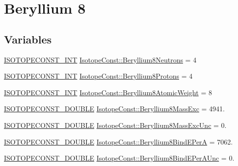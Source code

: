 \hypertarget{group___isotope_const-_beryllium-_be8}{}\section{Beryllium 8}
\label{group___isotope_const-_beryllium-_be8}
\subsection*{Variables}
\begin{DoxyCompactItemize}
\item 
\mbox{\hyperlink{group___isotope_const-_macros_ga5f18360b3e99483a35c32d789e62621c}{I\+S\+O\+T\+O\+P\+E\+C\+O\+N\+S\+T\+\_\+\+I\+NT}} \mbox{\hyperlink{group___isotope_const-_beryllium-_be8_ga0ece899d72ebfa6de79d0d7805ead65d}{Isotope\+Const\+::\+Beryllium8\+Neutrons}} = 4
\item 
\mbox{\hyperlink{group___isotope_const-_macros_ga5f18360b3e99483a35c32d789e62621c}{I\+S\+O\+T\+O\+P\+E\+C\+O\+N\+S\+T\+\_\+\+I\+NT}} \mbox{\hyperlink{group___isotope_const-_beryllium-_be8_ga16fd37dff5603a841104c9cd9bc81e29}{Isotope\+Const\+::\+Beryllium8\+Protons}} = 4
\item 
\mbox{\hyperlink{group___isotope_const-_macros_ga5f18360b3e99483a35c32d789e62621c}{I\+S\+O\+T\+O\+P\+E\+C\+O\+N\+S\+T\+\_\+\+I\+NT}} \mbox{\hyperlink{group___isotope_const-_beryllium-_be8_ga1052bf80b7c327e5efa0c2b952da37c9}{Isotope\+Const\+::\+Beryllium8\+Atomic\+Weight}} = 8
\item 
\mbox{\hyperlink{group___isotope_const-_macros_ga8f45a7272ce02c0b4c65c44636ed719a}{I\+S\+O\+T\+O\+P\+E\+C\+O\+N\+S\+T\+\_\+\+D\+O\+U\+B\+LE}} \mbox{\hyperlink{group___isotope_const-_beryllium-_be8_gaf70c107f9ac29e26f3074a243a3b7ac1}{Isotope\+Const\+::\+Beryllium8\+Mass\+Exc}} = 4941.
\item 
\mbox{\hyperlink{group___isotope_const-_macros_ga8f45a7272ce02c0b4c65c44636ed719a}{I\+S\+O\+T\+O\+P\+E\+C\+O\+N\+S\+T\+\_\+\+D\+O\+U\+B\+LE}} \mbox{\hyperlink{group___isotope_const-_beryllium-_be8_ga7cdb2252de7f2b7f92a947a6d06309a9}{Isotope\+Const\+::\+Beryllium8\+Mass\+Exc\+Unc}} = 0.
\item 
\mbox{\hyperlink{group___isotope_const-_macros_ga8f45a7272ce02c0b4c65c44636ed719a}{I\+S\+O\+T\+O\+P\+E\+C\+O\+N\+S\+T\+\_\+\+D\+O\+U\+B\+LE}} \mbox{\hyperlink{group___isotope_const-_beryllium-_be8_ga1ced61c909889e95afa0b619c997ffba}{Isotope\+Const\+::\+Beryllium8\+Bind\+E\+PerA}} = 7062.
\item 
\mbox{\hyperlink{group___isotope_const-_macros_ga8f45a7272ce02c0b4c65c44636ed719a}{I\+S\+O\+T\+O\+P\+E\+C\+O\+N\+S\+T\+\_\+\+D\+O\+U\+B\+LE}} \mbox{\hyperlink{group___isotope_const-_beryllium-_be8_ga4dc14f3aaf665965220f8617c89b6664}{Isotope\+Const\+::\+Beryllium8\+Bind\+E\+Per\+A\+Unc}} = 0.

\end{DoxyCompactItemize}
